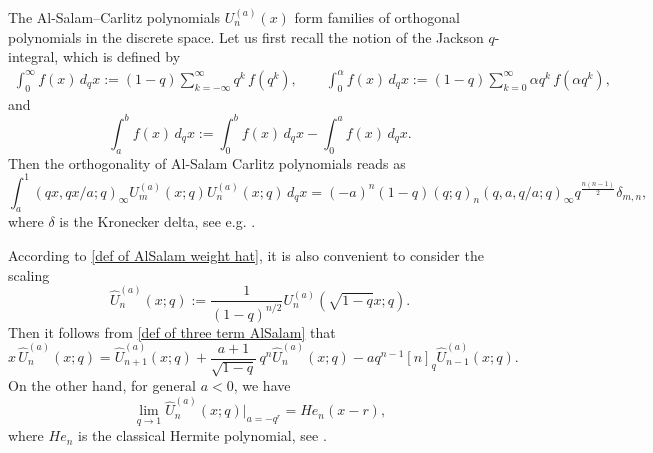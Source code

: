 \documentclass{amsart}
\theoremstyle{plain}
\theoremstyle{remark}
\numberwithin{equation}{section}
\begin{document}
 
The Al-Salam--Carlitz polynomials $U_n^{(a)}(x)$ form families of orthogonal polynomials in the discrete space. Let us first recall the notion of the Jackson $q$-integral, which is defined by
\begin{align}
\int_0^\infty f(x)\,d_qx  :=(1-q) \sum_{k=-\infty}^\infty q^k \, f(q^k) ,
\qquad 
\int_0^\alpha f(x)\,d_qx  :=(1-q)\sum_{k=0}^\infty \alpha  q^k\, f(\alpha q^k),
\end{align}
and 
\begin{equation}
\int_a^b f(x)\,d_qx  := \int_0^b f(x)\,d_q x - \int_0^a f(x)\,d_q x. 
\end{equation} 
Then the orthogonality of Al-Salam Carlitz polynomials reads as
\begin{equation} \label{def of orthogonality AlSalam}
    \int_{a}^{1}(qx,qx/a;q)_{\infty}U_{m}^{(a)}(x;q)U_{n}^{(a)}(x;q) \, d_{q}x
    =(-a)^{n}(1-q)(q;q)_{n}(q,a,q/a;q)_{\infty}q^{\frac{n(n-1)}{2}}\delta_{m,n}, 
\end{equation}
where $\delta$ is the Kronecker delta, see e.g. \cite[Section 14.24]{KLS10}.

According to \eqref{def of AlSalam weight hat}, it is also convenient to consider the scaling 
\begin{equation} \label{def of Un hat}
\widehat{U}_n^{(a)}(x;q):= \frac{1}{(1-q)^{n/2}} U_n^{(a)} ( \sqrt{1-q}x;q ). 
\end{equation}
Then it follows from \eqref{def of three term AlSalam} that 
\begin{equation} \label{def of three term AlSalam rescaling}
x\,\widehat{U}_n^{(a)}(x;q) = \widehat{U}_{n+1}^{(a)}(x;q) +\frac{a+1}{ \sqrt{1-q} }\, q^n \widehat{U}_n^{(a)}(x;q) -a q^{n-1} [n]_q \widehat{U}_{n-1}^{(a)}(x;q). 
\end{equation}
On the other hand, for general \( a <0 \),  we have 
\begin{equation}
\lim_{q \to 1} \widehat{U}_n^{(a)}(x;q)\Big|_{ a=-q^r } = He_n(x-r),   
\end{equation}
where $He_n$ is the classical Hermite polynomial, see \cite[Eq.~(2.11)]{BF00}.  

\medskip 
\end{document}
